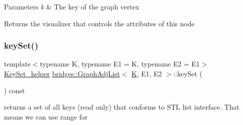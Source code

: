 \begin{DoxyParams}{Parameters}
{\em k} & The key of the graph vertex\\
\hline
\end{DoxyParams}
\begin{DoxyReturn}{Returns}
the visualizer that controls the attributes of this node 
\end{DoxyReturn}
\mbox{\label{classbridges_1_1_graph_adj_list_aa165a53244dee11b8759bd19eff156a4}} 
\subsubsection{\texorpdfstring{keySet()}{keySet()}}
{\footnotesize\ttfamily template$<$typename K, typename E1 = K, typename E2 = E1$>$ \\
\mbox{\hyperlink{classbridges_1_1_graph_adj_list_1_1_key_set__helper}{Key\+Set\+\_\+helper}} \mbox{\hyperlink{classbridges_1_1_graph_adj_list}{bridges\+::\+Graph\+Adj\+List}}$<$ \mbox{\hyperlink{namespacebridges_acfb0a4f7877d8f63de3e6862004c50edaa5f3c6a11b03839d46af9fb43c97c188}{K}}, E1, E2 $>$\+::key\+Set (\begin{DoxyParamCaption}{ }\end{DoxyParamCaption}) const\hspace{0.3cm}{\ttfamily [inline]}}

returns a set of all keys (read only) that conforms to S\+TL list interface. That means we can use range for \mbox{\label{classbridges_1_1_graph_adj_list_aa4ff90e6ae85d1bfbf73fc68ec5b74bb}} 
